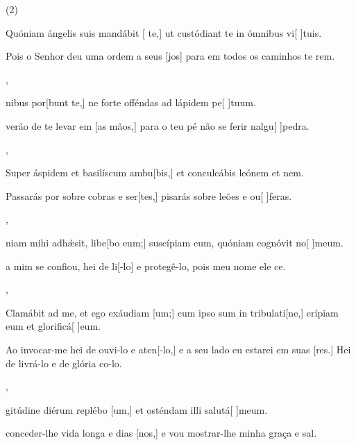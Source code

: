 \SetVersePairs(2){
  {\item {}Quóniam ángelis suis mandábit [ te,] ut custódiant te in ómnibus vi[ ]{tu}is.~\Responsorium}%
    {\item {}Pois o Senhor deu uma ordem a seus [jos] para em todos os caminhos te rem.~\Responsorium},
  {\item {}nibus por[bunt te,] ne forte offéndas ad lápidem pe[ ]{tu}um.~\Responsorium}%
    {\item {}verão de te levar em [as mãos,] para o teu pé não se ferir nalgu[ ]{pe}dra.~\Responsorium},
  {\item {}Super áspidem et basilíscum ambu[bis,] et conculcábis leónem et nem.~\Responsorium}%
    {\item {}Passarás por sobre cobras e ser[tes,] pisarás sobre leões e ou[ ]{fe}ras.~\Responsorium},
  {\item {}niam mihi adhǽsit, libe[bo eum;] suscípiam eum, quóniam cognóvit no[ ]{me}um.~\Responsorium}%
    {\item {} a mim se confiou, hei de li[-lo] e prote\-gê-lo, pois meu nome ele ce.~\Responsorium},
  {\item {}Clamábit ad me, et ego exáudiam [um;] cum ipso sum in tribulati[ne,] erípiam eum et glorificá[ ]{e}um.~\Responsorium}%
    {\item {}Ao invocar-me hei de ouvi-lo e aten[-lo,] e a seu lado eu estarei em suas [res.] Hei de livrá-lo e de glória co-lo.~\Responsorium},
  {\item {}gitúdine diérum replébo [um,] et osténdam illi salutá[ ]{me}um.~\Responsorium}%
    {\item {} conceder-lhe vida longa e dias [nos,] e vou mostrar-lhe minha graça e sal.~\Responsorium}
}